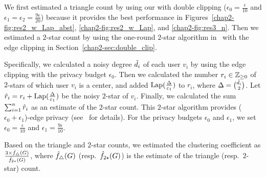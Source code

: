 We first estimated a triangle count by using our \AlgTwo{} with double clipping
($\epsilon_0 = \frac{\epsilon}{10}$ and
$\epsilon_1 = \epsilon_2 = \frac{9\epsilon}{20}$)
because it provides the best performance in Figures~\ref{chap2-fig:res2_w_Lap_abst}, \ref{chap2-fig:res2_w_Lap}, and \ref{chap2-fig:res3_n}.
Then we estimated a $2$-star count by
using the one-round $2$-star algorithm in~\cite{Imola_USENIX21} with the
edge clipping in Section~\ref{chap2-sec:double_clip}.

Specifically, we calculated a noisy degree $\tilde{d}_i$ of each user $v_i$ 
by using the edge clipping with the privacy budget $\epsilon_0$.
Then we calculated the number $r_i \in \mathbb{Z}_{\ge0}$ of $2$-stars of which user $v_i$ is a center, and added $\textrm{Lap}(\frac{\Delta}{\varepsilon_1})$ to $r_i$, where $\Delta = \binom{\tilde{d}_i}{2}$.
Let $\hat{r}_i = r_i + \textrm{Lap}(\frac{\Delta}{\varepsilon_1})$ be the noisy $2$-star of $v_i$.
Finally, we calculated
the sum $\sum_{i=1}^n \hat{r}_i$ as an estimate of the $2$-star count.
This $2$-star algorithm provides ($\epsilon_0 + \epsilon_1$)-edge privacy (see~\cite{Imola_USENIX21} for details).
For the privacy budgets $\epsilon_0$ and $\epsilon_1$, we set $\epsilon_0 = \frac{\epsilon}{10}$ and $\epsilon_1 = \frac{9\epsilon}{10}$.

Based on the triangle and $2$-star counts, we estimated the clustering coefficient as
$\frac{3 \times \hat{f}_\triangle(G)}{\hat{f}_{2\star}(G)}$,
where $\hat{f}_\triangle(G)$ (resp.~$\hat{f}_{2\star}(G)$) is the estimate of the triangle (resp.~$2$-star) count.

